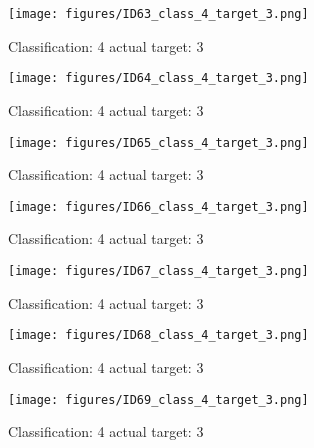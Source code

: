 \begin{figure}[h!]
\begin{center}
\texttt{[image: figures/ID63\_class\_4\_target\_3.png]}
\end{center}
\caption{ Classification: 4 actual target: 3}
\label{fig:ID63_class_4_target_3}
\end{figure}
\begin{figure}[h!]
\begin{center}
\texttt{[image: figures/ID64\_class\_4\_target\_3.png]}
\end{center}
\caption{ Classification: 4 actual target: 3}
\label{fig:ID64_class_4_target_3}
\end{figure}
\begin{figure}[h!]
\begin{center}
\texttt{[image: figures/ID65\_class\_4\_target\_3.png]}
\end{center}
\caption{ Classification: 4 actual target: 3}
\label{fig:ID65_class_4_target_3}
\end{figure}
\begin{figure}[h!]
\begin{center}
\texttt{[image: figures/ID66\_class\_4\_target\_3.png]}
\end{center}
\caption{ Classification: 4 actual target: 3}
\label{fig:ID66_class_4_target_3}
\end{figure}
\begin{figure}[h!]
\begin{center}
\texttt{[image: figures/ID67\_class\_4\_target\_3.png]}
\end{center}
\caption{ Classification: 4 actual target: 3}
\label{fig:ID67_class_4_target_3}
\end{figure}
\begin{figure}[h!]
\begin{center}
\texttt{[image: figures/ID68\_class\_4\_target\_3.png]}
\end{center}
\caption{ Classification: 4 actual target: 3}
\label{fig:ID68_class_4_target_3}
\end{figure}
\begin{figure}[h!]
\begin{center}
\texttt{[image: figures/ID69\_class\_4\_target\_3.png]}
\end{center}
\caption{ Classification: 4 actual target: 3}
\label{fig:ID69_class_4_target_3}
\end{figure}
